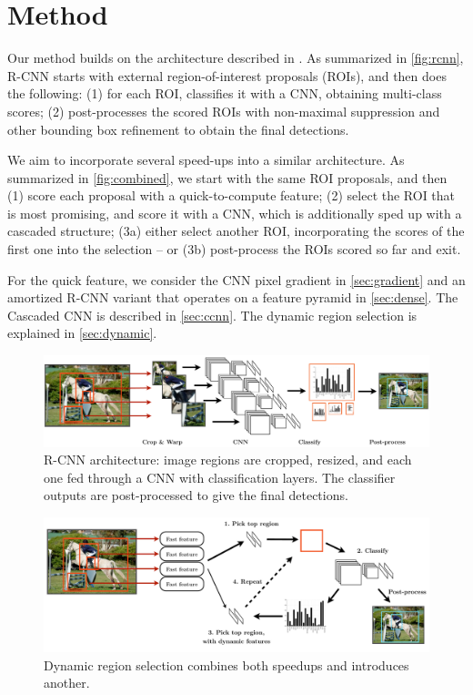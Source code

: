 \section{Method}\label{sec:method}

Our method builds on the architecture described in \cite{Girshick-CVPR-2014}.
As summarized in \autoref{fig:rcnn}, R-CNN starts with external region-of-interest proposals (ROIs), and then does the following: (1) for each ROI, classifies it with a CNN, obtaining multi-class scores; (2) post-processes the scored ROIs with non-maximal suppression and other bounding box refinement to obtain the final detections.

We aim to incorporate several speed-ups into a similar architecture.
As summarized in \autoref{fig:combined}, we start with the same ROI proposals, and then (1) score each proposal with a quick-to-compute feature; (2) select the ROI that is most promising, and score it with a CNN, which is additionally sped up with a cascaded structure; (3a) either select another ROI, incorporating the scores of the first one into the selection -- or (3b) post-process the ROIs scored so far and exit.

For the quick feature, we consider the CNN pixel gradient in \autoref{sec:gradient} and an amortized R-CNN variant that operates on a feature pyramid in \autoref{sec:dense}.
The Cascaded CNN is described in \autoref{sec:ccnn}.
The dynamic region selection is explained in \autoref{sec:dynamic}.

\begin{figure}[h!]
\begin{center}
\includegraphics[width=0.98\columnwidth]{figures/rcnn.pdf}
\caption{
R-CNN architecture: image regions are cropped, resized, and each one fed through a CNN with classification layers.
The classifier outputs are post-processed to give the final detections.
}\label{fig:rcnn}
\end{center}
\end{figure}

\begin{figure}[h!]
\begin{center}
\includegraphics[width=0.98\columnwidth]{figures/combined.pdf}
\caption{
Dynamic region selection combines both speedups and introduces another.
}\label{fig:combined}
\end{center}
\end{figure}

